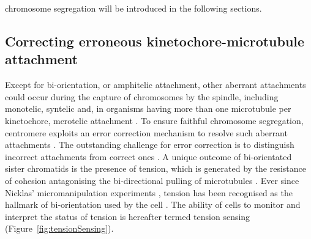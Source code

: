 chromosome segregation will be introduced in the following sections. 

\subsection{Correcting erroneous kinetochore-microtubule attachment}

Except for bi-orientation, or amphitelic attachment, other aberrant attachments could occur during the capture of chromosomes by the spindle, including monotelic, syntelic and, in organisms having more than one microtubule per kinetochore, merotelic attachment \citep{Tanaka2010Kinetochore-microtubuleBi-orientation}. To ensure faithful chromosome segregation, centromere exploits an error correction mechanism to resolve such aberrant attachments \citep{Tanaka2022SWAPCorrection}. The outstanding challenge for error correction is to distinguish incorrect attachments from correct ones \citep{Lampson2011SensingFunction}. A unique outcome of bi-orientated sister chromatids is the presence of tension, which is generated by the resistance of cohesion antagonising the bi-directional pulling of microtubules \citep{Nicklas1997HowChromosomes}. Ever since Nicklas' micromanipulation experiments \citep{Nicklas1969CHROMOSOMEChromosomes, Nicklas1963AMovement}, tension has been recognised as the hallmark of bi-orientation used by the cell \citep{McVey2021AuroraSegregation}. The ability of cells to monitor and interpret the status of tension is hereafter termed tension sensing (Figure~\ref{fig:tensionSensing}). 

